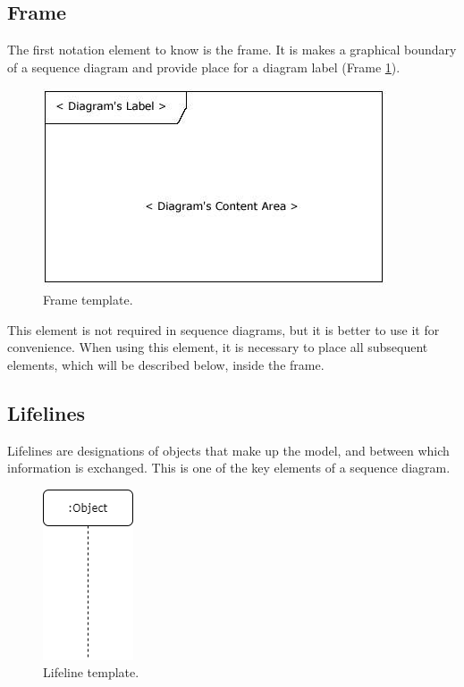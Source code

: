 \documentclass[10pt,slovak,a4paper]{article}
\begin{document}



\subsection{Frame} \label{notation:frame}
The first notation element to know is the frame. It is makes a graphical boundary of a sequence diagram and provide place for a diagram label (Frame \ref{fig:frame}). 
\begin{figure}[tbh]
\centering
\includegraphics[scale=0.5]{frame.jpg}
\caption{Frame template.}
\label{fig:frame}
\end{figure}

This element is not required in sequence diagrams, but it is better to use it for convenience. When using this element, it is necessary to place all subsequent elements, which will be described below, inside the frame.

\subsection{Lifelines} \label{notation:lifelines}
Lifelines are designations of objects that make up the model, and between which information is exchanged. This is one of the key elements of a sequence diagram.
\begin{figure}[tbh]
	\centering
	\includegraphics[scale=0.6]{lifeline.png}
	\caption{Lifeline template.}
	\label{fig:lifeline}
\end{figure}
\end{document}
